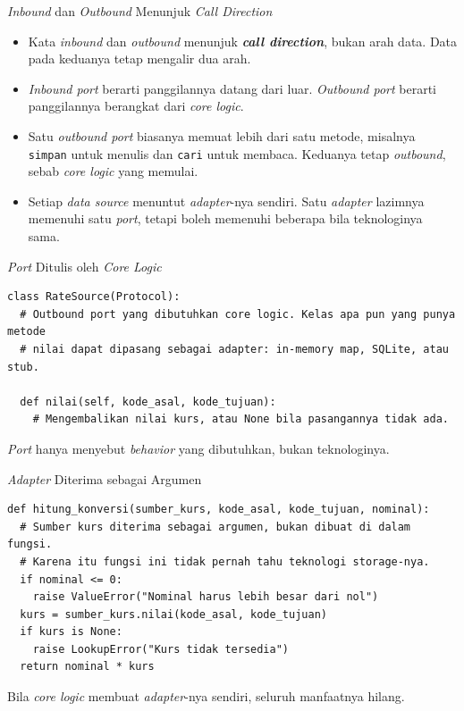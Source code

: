 \documentclass[aspectratio=169, table, 12pt]{beamer}
\begin{document}
\begin{frame}{{\Large \textit{Inbound} dan \textit{Outbound} Menunjuk
  \textit{Call Direction}}}
  \vspace{8pt}
  \begin{itemize}\small
    \item Kata \textit{inbound} dan \textit{outbound} menunjuk
      \textbf{\textit{call direction}}, bukan arah data. Data pada keduanya
      tetap mengalir dua arah.
    \item \textit{Inbound port} berarti panggilannya datang dari luar.
      \textit{Outbound port} berarti panggilannya berangkat dari \textit{core
      logic}.
    \item Satu \textit{outbound port} biasanya memuat lebih dari satu metode,
      misalnya \texttt{simpan} untuk menulis dan \texttt{cari} untuk membaca.
      Keduanya tetap \textit{outbound}, sebab \textit{core logic} yang memulai.
    \item Setiap \textit{data source} menuntut \textit{adapter}-nya sendiri.
      Satu \textit{adapter} lazimnya memenuhi satu \textit{port}, tetapi boleh
      memenuhi beberapa bila teknologinya sama.
  \end{itemize}
\end{frame}

\begin{frame}[fragile]{{\Large \textit{Port} Ditulis oleh \textit{Core Logic}}}
  \vspace{5pt}
\begin{lstlisting}[style=PythonStyle]
class RateSource(Protocol):
  # Outbound port yang dibutuhkan core logic. Kelas apa pun yang punya metode
  # nilai dapat dipasang sebagai adapter: in-memory map, SQLite, atau stub.

  def nilai(self, kode_asal, kode_tujuan):
    # Mengembalikan nilai kurs, atau None bila pasangannya tidak ada.
\end{lstlisting}

  \vspace{5pt}
  {\small \textit{Port} hanya menyebut \textit{behavior} yang dibutuhkan, bukan
  teknologinya.}
\end{frame}

\begin{frame}[fragile]{{\Large \textit{Adapter} Diterima sebagai Argumen}}
  \vspace{5pt}
\begin{lstlisting}[style=PythonStyle, basicstyle=\ttfamily\footnotesize]
def hitung_konversi(sumber_kurs, kode_asal, kode_tujuan, nominal):
  # Sumber kurs diterima sebagai argumen, bukan dibuat di dalam fungsi.
  # Karena itu fungsi ini tidak pernah tahu teknologi storage-nya.
  if nominal <= 0:
    raise ValueError("Nominal harus lebih besar dari nol")
  kurs = sumber_kurs.nilai(kode_asal, kode_tujuan)
  if kurs is None:
    raise LookupError("Kurs tidak tersedia")
  return nominal * kurs
\end{lstlisting}

  \vspace{5pt}
  {\small Bila \textit{core logic} membuat \textit{adapter}-nya sendiri,
  seluruh manfaatnya hilang.}
\end{frame}
\end{document}

